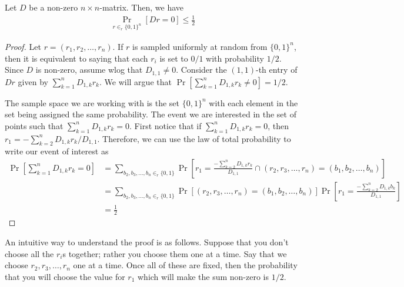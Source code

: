 \begin{lemma}
	Let $D$ be a non-zero $n\times n$-matrix. Then, we have
	\begin{align*}
		\Pr_{r \in_r \{0,1\}^n} [Dr = 0] \leq \frac{1}{2}
	\end{align*}
	\label{lem:matr-ver}
\end{lemma}
\begin{proof}
	Let $r=(r_1, r_2, \ldots, r_n)$. If $r$ is sampled uniformly at random from $\{0,1\}^n$, then it is equivalent to saying that each $r_i$ is set to $0/1$ with probability $1/2$. Since $D$ is non-zero, assume wlog that $D_{1,1} \neq 0$. Consider the $(1,1)$-th entry of $Dr$ given by $\sum_{k=1}^n D_{1,k} r_k$. We will argue that $\Pr[\sum_{k=1}^n D_{1,k} r_k \neq 0] = 1/2$. 
	
	The sample space we are working with is the set $\{0,1\}^n$ with each element in the set being assigned the same probability. The event we are interested in the set of points such that $\sum_{k=1}^n D_{1,k}r_k = 0$. First notice that if $\sum_{k=1}^n D_{1,k}r_k = 0$, then $r_1 = -\sum_{k=2}^n D_{1,k}r_k/D_{1,1}$. Therefore, we can use the law of total probability to write our event of interest as 
	\begin{align*}
		\Pr[\sum_{k=1}^n D_{1,k} r_k = 0] &= \sum_{b_2, b_3, \ldots, b_n \in_r \{0,1\}} \Pr\left[ r_1 = \frac{-\sum_{k=2}^n D_{1,k}r_k}{D_{1,1}} \cap (r_2, r_3, \ldots, r_n) = (b_1, b_2, \ldots, b_n) \right]\\
		&= \sum_{b_2, b_3, \ldots, b_n \in_r \{0,1\}} \Pr\left[ (r_2, r_3, \ldots, r_n) = (b_1, b_2, \ldots, b_n) \right] \Pr\left[ r_1 = \frac{-\sum_{k=2}^n D_{1,k}b_k}{D_{1,1}} \right]\\
		&= \frac{1}{2}
	\end{align*}
\end{proof}

An intuitive way to understand the proof is as follows. Suppose that you don't choose all the $r_i$s together; rather you choose them one at a time. Say that we choose $r_2, r_3, \ldots, r_n$ one at a time.
Once all of these are fixed, then the probability that you will choose the value for $r_1$ which will make the sum non-zero is $1/2$.


